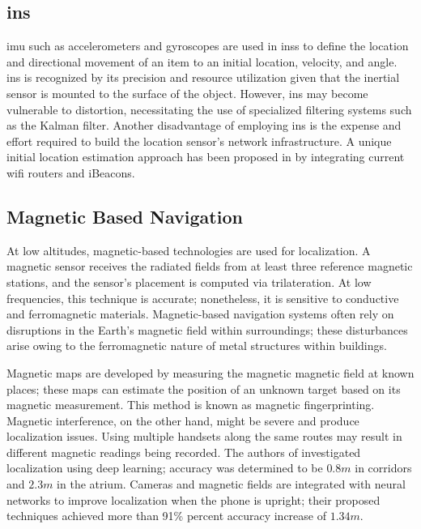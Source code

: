 \subsection{\acf{ins}}
\ac{imu} such as accelerometers and gyroscopes are used in \ac{ins}s to define the location and directional movement of an item to an initial location, velocity, and angle.
\ac{ins} is recognized by its precision and resource utilization given that the inertial sensor is mounted to the surface of the object.
However, \ac{ins} may become vulnerable to distortion, necessitating the use of specialized filtering systems such as the Kalman filter\cite{hu2020improving}.
Another disadvantage of employing \ac{ins} is the expense and effort required to build the location sensor's network infrastructure.
A unique initial location estimation approach has been proposed in\cite{chen2016smartphone} by integrating current \ac{wifi} routers and iBeacons.

\subsection{Magnetic Based Navigation}
At low altitudes, magnetic-based technologies are used for localization.
A magnetic sensor receives the radiated fields from at least three reference magnetic stations, and the sensor's placement is computed via trilateration.
At low frequencies, this technique is accurate;
nonetheless, it is sensitive to conductive and ferromagnetic materials.
Magnetic-based navigation systems often rely on disruptions in the Earth's magnetic field within surroundings;
these disturbances arise owing to the ferromagnetic nature of metal structures within buildings\cite{shu2015magicol}.

Magnetic maps are developed by measuring the magnetic magnetic field at known places;
these maps can estimate the position of an unknown target based on its magnetic measurement.
This method is known as magnetic fingerprinting.
Magnetic interference, on the other hand, might be severe and produce localization issues.
Using multiple handsets along the same routes may result in different magnetic readings being recorded.
The authors of\cite{lee2018amid} investigated localization using deep learning;
accuracy was determined to be $0.8 m$ in corridors and $2.3 m$ in the atrium.
Cameras and magnetic fields are integrated with neural networks to improve localization when the phone is upright;
their proposed techniques\cite{liu2016fusion} achieved more than 91\% percent accuracy increase of $1.34 m$.

